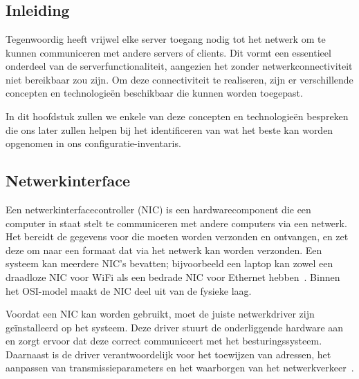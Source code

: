 
\chapter{}%
\label{ch:computernetwerk-concepten}

\section{Inleiding}
\label{netwerk_inleiding}

Tegenwoordig heeft vrijwel elke server toegang nodig tot het netwerk om te kunnen communiceren met andere servers of clients.
Dit vormt een essentieel onderdeel van de serverfunctionaliteit, aangezien het zonder netwerkconnectiviteit niet bereikbaar zou zijn.
Om deze connectiviteit te realiseren, zijn er verschillende concepten en technologie\"en beschikbaar die kunnen worden toegepast.

In dit hoofdstuk zullen we enkele van deze concepten en technologie\"en bespreken die ons later zullen helpen bij het identificeren van wat het beste kan worden opgenomen in ons configuratie-inventaris.

\section{Netwerkinterface}
\label{netwerk_netwerkinterface}

Een netwerkinterfacecontroller (NIC) is een hardwarecomponent die een computer in staat stelt te communiceren met andere computers via een netwerk.
Het bereidt de gegevens voor die moeten worden verzonden en ontvangen, en zet deze om naar een formaat dat via het netwerk kan worden verzonden.
Een systeem kan meerdere NIC's bevatten; bijvoorbeeld een laptop kan zowel een draadloze NIC voor WiFi als een bedrade NIC voor Ethernet hebben~\autocite{hypponen2021securing}.
Binnen het OSI-model maakt de NIC deel uit van de fysieke laag.

Voordat een NIC kan worden gebruikt, moet de juiste netwerkdriver zijn geïnstalleerd op het systeem.
Deze driver stuurt de onderliggende hardware aan en zorgt ervoor dat deze correct communiceert met het besturingssysteem.
Daarnaast is de driver verantwoordelijk voor het toewijzen van adressen, het aanpassen van transmissieparameters en het waarborgen van het netwerkverkeer~\autocite{hypponen2021securing}.

